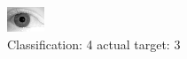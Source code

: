 \begin{figure}[h!]
\begin{center}
\includegraphics[width=0.60\columnwidth]{figures/ID2194_class_4_target_3.png}
\end{center}
\caption{ Classification: 4 actual target: 3}
\label{fig:ID2194_class_4_target_3}
\end{figure}
